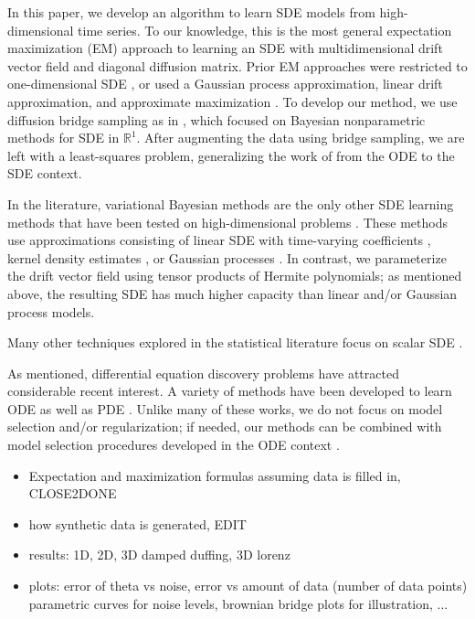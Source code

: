\documentclass{article}
\begin{document}
In this paper, we develop an algorithm to learn SDE models from high-dimensional time series.  To our knowledge, this is the most general expectation maximization (EM) approach to learning an SDE with multidimensional drift vector field and diagonal diffusion matrix.  Prior EM approaches were restricted to one-dimensional SDE \cite{ghahramani_learning_1999}, or used a Gaussian process approximation, linear drift approximation, and approximate maximization \cite{ruttor_approximate_2013}.  To develop our method, we use diffusion bridge sampling as in \cite{van_der_meulen_reversible_2014, meulen_adaptive_2017}, which focused on Bayesian nonparametric methods for SDE in $\mathbb{R}^1$.  After augmenting the data using bridge sampling, we are left with a least-squares problem, generalizing the work of \cite{brunton_discovering_2016} from the ODE to the SDE context.

In the literature, variational Bayesian methods are the only other SDE learning methods that have been tested on high-dimensional problems \cite{vrettas_variational_2015}.  These methods use approximations consisting of linear SDE with time-varying coefficients \cite{archambeau_variational_2008}, kernel density estimates \cite{batz_variational_2016}, or Gaussian processes \cite{batz_approximate_2017}.  In contrast, we parameterize the drift vector field using tensor products of Hermite polynomials; as mentioned above, the resulting SDE has much higher capacity than linear and/or Gaussian process models.

Many other techniques explored in the statistical literature focus on scalar SDE \cite{nicolau_nonparametric_2007, muller_empirical_2010, verzelen_inferring_2012, bhat_nonparametric_2016}.

As mentioned, differential equation discovery problems have attracted considerable recent interest.  A variety of methods have been developed to learn ODE \cite{brunton_discovering_2016, schon_probabilistic_2017, chen_network_2017, tran_exact_2017, schaeffer_extracting_2017, schaeffer_learning_2017, quade_sparse_2018} as well as PDE \cite{schaeffer_sparse_2013, raissi_machine_2017, rudy_data-driven_2017, raissi_hidden_2018}.  Unlike many of these works, we do not focus on model selection and/or regularization; if needed, our methods can be combined with model selection procedures developed in the ODE context \cite{mangan_inferring_2016, mangan_model_2017}.

\begin{itemize}
\item Expectation and maximization formulas assuming data is filled in, CLOSE2DONE
\item how synthetic data is generated, EDIT
\item results: 1D, 2D, 3D damped duffing, 3D lorenz
\item plots: error of theta vs noise, error vs amount of data (number of data points) parametric curves for noise levels, brownian bridge plots for illustration, ...
\end{itemize}
\end{document}
